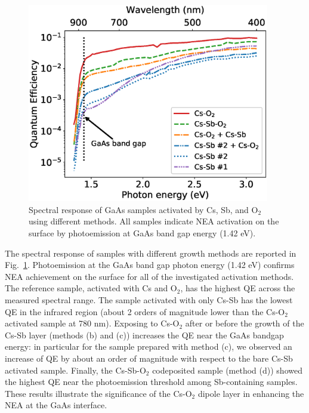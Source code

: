 
\begin{figure}
	\centering
	\includegraphics*[width=300pt]{figs/CsSbO/sr.eps}
	\caption{Spectral response of GaAs samples activated by Cs, Sb, and O$_2$ using different methods. All samples indicate NEA activation on the surface by photoemission at GaAs band gap energy (1.42 eV).
	}
	\label{fig_sr}
\end{figure}

The spectral response of samples with different growth methods are reported in Fig.~\ref{fig_sr}. %
Photoemission at the GaAs band gap photon energy (1.42 eV) confirms NEA achievement on the surface for all of the investigated activation methods. The reference sample, activated with Cs and O$_2$, has the highest QE across the measured spectral range. The sample activated with only Cs-Sb has the lowest QE in the infrared region (about 2 orders of magnitude lower than the Cs-O$_2$ activated sample at 780 nm). Exposing to Cs-O$_2$ after or before the growth of the Cs-Sb layer (methods (b) and (c)) increases the QE near the GaAs bandgap energy: in particular for the sample prepared with method (c), we observed an increase of QE by about an order of magnitude with respect to the bare Cs-Sb activated sample. Finally, the Cs-Sb-O$_2$ codeposited sample (method (d)) showed the highest QE near the photoemission threshold among Sb-containing samples. These results illustrate the significance of the Cs-O$_2$ dipole layer in enhancing the NEA at the GaAs interface.

